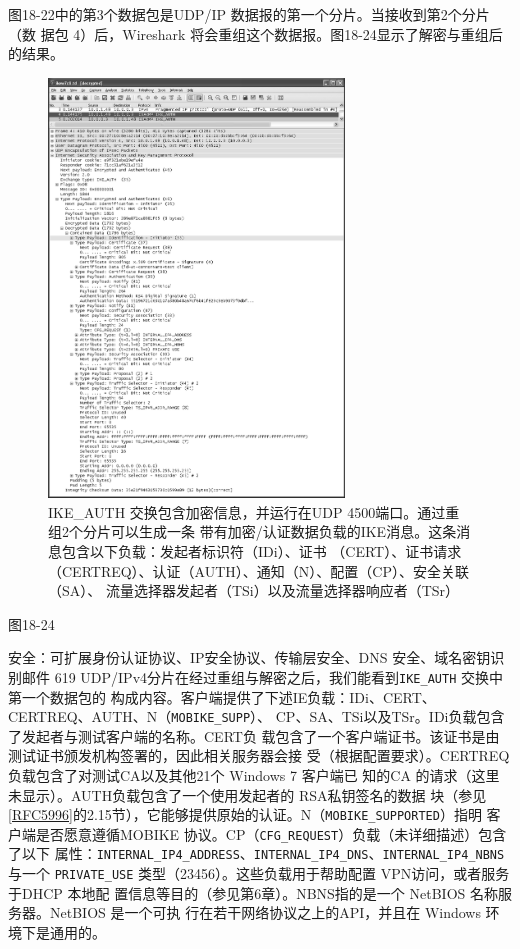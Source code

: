 图18-22中的第3个数据包是UDP/IP 数据报的第一个分片。当接收到第2个分片（数
据包 4）后，Wireshark 将会重组这个数据报。图18-24显示了解密与重组后的结果。
\begin{figure}[!htb]
    \centering
	\includegraphics[width=0.7\textwidth]{imgs/18/18-24.png}
	\caption{IKE\_AUTH 交换包含加密信息，并运行在UDP 4500端口。通过重组2个分片可以生成一条
            带有加密/认证数据负载的IKE消息。这条消息包含以下负载：发起者标识符（IDi）、证书
            （CERT）、证书请求（CERTREQ）、认证（AUTH）、通知（N）、配置（CP）、安全关联（SA）、
            流量选择器发起者（TSi）以及流量选择器响应者（TSr）}
\end{figure}
图18-24

安全：可扩展身份认证协议、IP安全协议、传输层安全、DNS 安全、域名密钥识别邮件 619
UDP/IPv4分片在经过重组与解密之后，我们能看到\verb|IKE_AUTH| 交换中第一个数据包的
构成内容。客户端提供了下述IE负载：IDi、CERT、CERTREQ、AUTH、N（\verb|MOBIKE_SUPP|）、
CP、SA、TSi以及TSr。IDi负载包含了发起者与测试客户端的名称。CERT负
载包含了一个客户端证书。该证书是由测试证书颁发机构签署的，因此相关服务器会接
受（根据配置要求）。CERTREQ负载包含了对测试CA以及其他21个 Windows 7 客户端已
知的CA 的请求（这里未显示）。AUTH负载包含了一个使用发起者的 RSA私钥签名的数据
块（参见\href{https://www.rfc-editor.org/rfc/rfc5996}{[RFC5996]}的2.15节），它能够提供原始的认证。N（\verb|MOBIKE_SUPPORTED|）指明
客户端是否愿意遵循MOBIKE 协议。CP（\verb|CFG_REQUEST|）负载（未详细描述）包含了以下
属性：\verb|INTERNAL_IP4_ADDRESS|、\verb|INTERNAL_IP4_DNS|、\verb|INTERNAL_IP4_NBNS| 与一个
\verb|PRIVATE_USE| 类型（23456）。这些负载用于帮助配置 VPN访问，或者服务于DHCP 本地配
置信息等目的（参见第6章）。NBNS指的是一个 NetBIOS 名称服务器。NetBIOS 是一个可执
行在若干网络协议之上的API，并且在 Windows 环境下是通用的。

